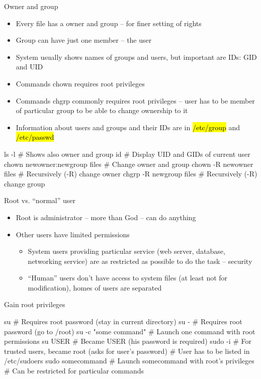 \documentclass[compress, ucs, xelatex, 11pt, xcolor=svgnames,
  hyperref={
    bookmarks=true,
    unicode=true,
    colorlinks=true,
    pdftitle={Linux, command line and MetaCentrum},
    plainpages=false,
    pdfauthor={Vojtech Zeisek},
    pdfsubject={Course about use of Linux command line, writing shell scripts and using MetaCentrum of CESNET},
    pdfcreator={XeLaTeX},
    pdfkeywords={Linux, GNU, BASH, shell, command line, MetaCentrum},
    linkcolor=DarkRed,
    anchorcolor=DarkBlue,
    citecolor=Indigo,
    filecolor=NavyBlue,
    menucolor=DarkMagenta,
    urlcolor=DarkBlue,
    pdftex},
  url={hyphens, lowtilde} %
  ]{beamer}
\renewcommand{\texttt}[1]{\hl{\ttfamily #1}}
\begin{document}
\begin{frame}[fragile]{Owner and group}
\begin{itemize}
  \item Every file has a owner and group -- for finer setting of rights
  \item Group can have just one member -- the user
  \item System usually shows names of groups and users, but important are IDs: GID and UID
  \item Commands chown requires root privileges
  \item Commands chgrp commonly requires root privileges -- user has to be member of particular group to be able to change ownership to it
  \item Information about users and groups and their IDs are in \texttt{/etc/group} and \texttt{/etc/passwd}
\end{itemize}
  \begin{bashcode}
    ls -l # Shows also owner and group
    id # Display UID and GIDs of current user
    chown newowner:newgroup files # Change owner and group
    chown -R newowner files # Recursively (-R) change owner
    chgrp -R newgroup files # Recursively (-R) change group
  \end{bashcode}
\end{frame}

\begin{frame}[fragile]{Root vs. ``normal'' user}
\begin{itemize}
  \item Root is administrator -- more than God -- can do anything
  \item Other users have limited permissions
  \begin{itemize}
    \item System users providing particular service (web server, database, networking service) are as restricted as possible to do the task -- security
    \item ``Human'' users don't have access to system files (at least not for modification), homes of users are separated
  \end{itemize}
\end{itemize}
Gain root privileges
  \begin{bashcode}
    su # Requires root password (stay in current directory)
    su - # Requires root password (go to /root)
    su -c "some command" # Launch one command with root permissions
    su USER # Became USER (his password is required)
    sudo -i # For trusted users, became root (asks for user's password)
            # User has to be listed in /etc/sudoers
    sudo somecommand # Launch somecommand with root's privileges
                     # Can be restricted for particular commands
  \end{bashcode}
\end{frame}
\end{document}
